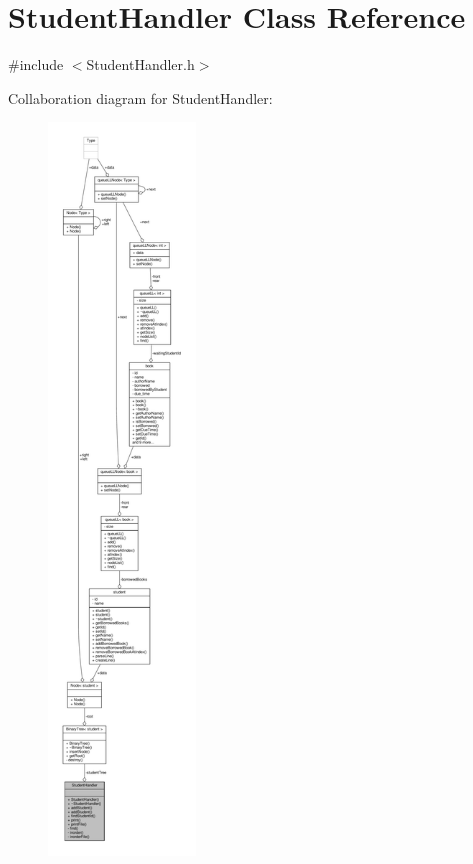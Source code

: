 \hypertarget{class_student_handler}{}\section{Student\+Handler Class Reference}
\label{class_student_handler}


{\ttfamily \#include $<$Student\+Handler.\+h$>$}



Collaboration diagram for Student\+Handler\+:
\nopagebreak
\begin{figure}[H]
\begin{center}
\leavevmode
\includegraphics[height=550pt]{class_student_handler__coll__graph}
\end{center}
\end{figure}
